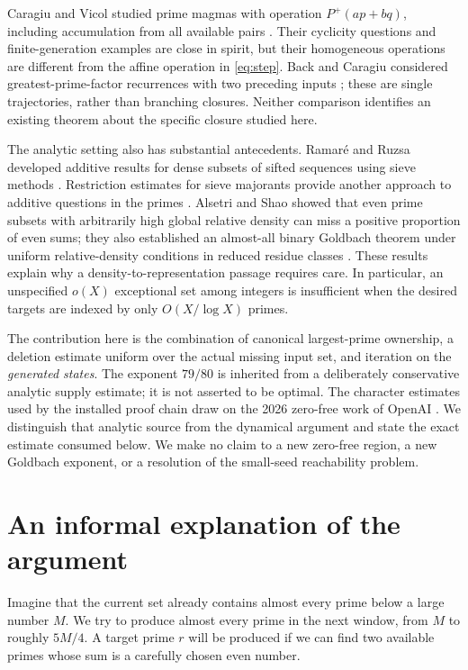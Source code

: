 \documentclass[11pt]{article}
\theoremstyle{definition}
\theoremstyle{remark}
\begin{document}
Caragiu and Vicol studied prime magmas with operation
\(P^{+}(ap+bq)\), including accumulation from all available pairs
\cite{CV}. Their cyclicity questions and finite-generation examples are
close in spirit, but their homogeneous operations are different from
the affine operation in \eqref{eq:step}. Back and Caragiu considered
greatest-prime-factor recurrences with two preceding inputs
\cite{BC}; these are single trajectories, rather than branching
closures. Neither comparison identifies an existing theorem about the
specific closure studied here.

The analytic setting also has substantial antecedents. Ramar\'e and
Ruzsa developed additive results for dense subsets of sifted sequences
using sieve methods \cite{RR}. Restriction estimates for sieve
majorants provide another approach to additive questions in the primes
\cite{GT}. Alsetri and Shao showed that even prime subsets with arbitrarily
high global relative density can miss a positive proportion of even
sums; they also established an almost-all binary Goldbach theorem under
uniform relative-density conditions in reduced residue classes
\cite{AS}. These results explain why a density-to-representation passage
requires care. In particular, an unspecified \(o(X)\) exceptional set
among integers is insufficient when the desired targets are indexed by
only \(O(X/\log X)\) primes.

The contribution here is the combination of canonical largest-prime
ownership, a deletion estimate uniform over the actual missing input
set, and iteration on the \emph{generated states}. The exponent \(79/80\)
is inherited from a deliberately conservative analytic supply estimate;
it is not asserted to be optimal. The character estimates used by the
installed proof chain draw on the 2026 zero-free work of OpenAI
\cite{OAI}. We distinguish that analytic source from the dynamical
argument and state the exact estimate consumed below. We make no claim
to a new zero-free region, a new Goldbach exponent, or a resolution of
the small-seed reachability problem.

\section{An informal explanation of the argument}\label{sec:informal}

Imagine that the current set already contains almost every prime below a
large number \(M\). We try to produce almost every prime in the next window,
from \(M\) to roughly \(5M/4\). A target prime \(r\) will be produced if we
can find two available primes whose sum is a carefully chosen even number.
\end{document}

